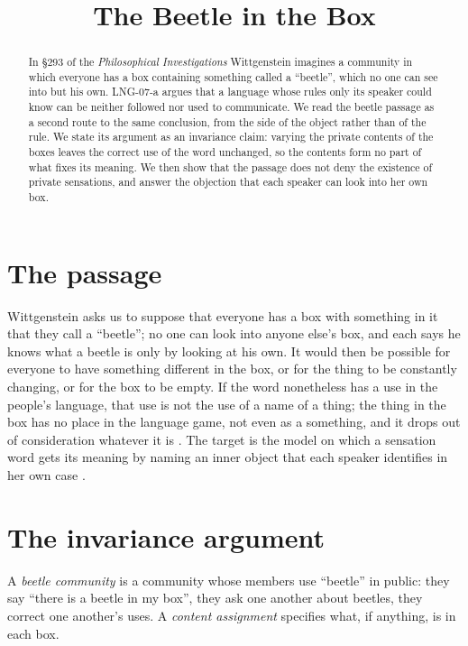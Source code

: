 \documentclass{situationist-preprint}
\title{The Beetle in the Box}
\begin{document}
\maketitle

\begin{abstract}
In \S293 of the \emph{Philosophical Investigations} Wittgenstein imagines a community in which everyone has a box containing something called a \enquote{beetle}, which no one can see into but his own. LNG-07-a argues that a language whose rules only its speaker could know can be neither followed nor used to communicate. We read the beetle passage as a second route to the same conclusion, from the side of the object rather than of the rule. We state its argument as an invariance claim: varying the private contents of the boxes leaves the correct use of the word unchanged, so the contents form no part of what fixes its meaning. We then show that the passage does not deny the existence of private sensations, and answer the objection that each speaker can look into her own box.
\end{abstract}

\section{The passage}

Wittgenstein asks us to suppose that everyone has a box with something in it that they call a \enquote{beetle}; no one can look into anyone else's box, and each says he knows what a beetle is only by looking at his own. It would then be possible for everyone to have something different in the box, or for the thing to be constantly changing, or for the box to be empty. If the word nonetheless has a use in the people's language, that use is not the use of a name of a thing; the thing in the box has no place in the language game, not even as a something, and it drops out of consideration whatever it is \citep[§293]{Wittgenstein1953}. The target is the model on which a sensation word gets its meaning by naming an inner object that each speaker identifies in her own case \citep[§§243, 258]{Wittgenstein1953}.

\section{The invariance argument}

\begin{definition}\label{d:game}
A \emph{beetle community} is a community whose members use \enquote{beetle} in public: they say \enquote{there is a beetle in my box}, they ask one another about beetles, they correct one another's uses. A \emph{content assignment} specifies what, if anything, is in each box.
\end{definition}
\end{document}
